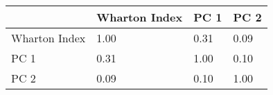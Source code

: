 \begin{tabular}{p{3cm}p{3cm}p{3cm}p{3cm}}
\toprule
 & Wharton Index & PC 1 & PC 2 \\
\midrule
Wharton Index & 1.00 & 0.31 & 0.09 \\
PC 1 & 0.31 & 1.00 & 0.10 \\
PC 2 & 0.09 & 0.10 & 1.00 \\
\bottomrule
\end{tabular}

